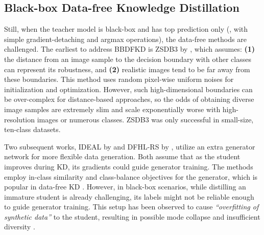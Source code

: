 \subsection{Black-box Data-free Knowledge Distillation} \label{ssec:02-related-bbdfkd}
\begin{foldable} %
    Still, when the teacher model is black-box and has top prediction only (\ie, with simple gradient-detaching and argmax operations), the data-free methods are challenged.
    The earliest to address BBDFKD is ZSDB3 by \citet{wang2021zero}, which assumes: \textbf{(1)} the distance from an image sample to the decision boundary with other classes can represent its robustness, and \textbf{(2)} realistic images tend to be far away from these boundaries.
    This method uses random pixel-wise uniform noises for initialization and optimization.
    However, such high-dimensional boundaries can be over-complex for distance-based approaches, so the odds of obtaining diverse image samples are extremely slim and scale exponentially worse with high-resolution images or numerous classes.
    ZSDB3 was only successful in small-size, ten-class datasets.
\end{foldable}

\begin{foldable} %
    Two subsequent works, IDEAL by \citet{zhang2022ideal} and DFHL-RS by \citet{yuan2024data}, utilize an extra generator network for more flexible data generation.
    Both assume that as the student improves during KD, its gradients could guide generator training.
    The methods employ in-class similarity and class-balance objectives for the generator, which is popular in data-free KD \citep{chen2019data}.
    However, in black-box scenarios, while distilling an immature student is already challenging, its labels might not be reliable enough to guide generator training.
    This setup has been observed to cause \textit{``overfitting of synthetic data''} to the student, resulting in possible mode collapse and insufficient diversity \citep{yuan2024data}.
\end{foldable}